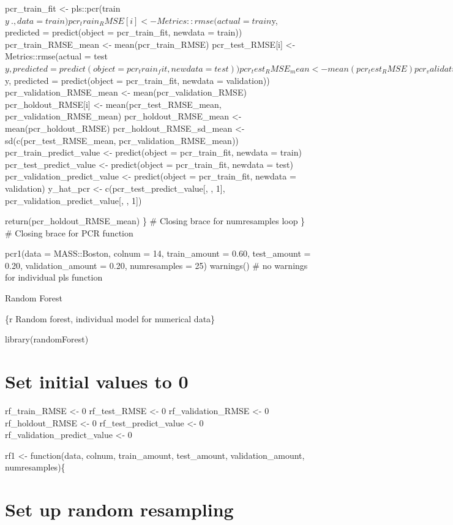 \documentclass[
]{book}
\begin{document}
pcr\_train\_fit \textless- pls::pcr(train\(y ~ ., data = train)
  pcr_train_RMSE[i] <- Metrics::rmse(actual = train\)y, predicted =
predict(object = pcr\_train\_fit, newdata = train)) pcr\_train\_RMSE\_mean
\textless- mean(pcr\_train\_RMSE) pcr\_test\_RMSE{[}i{]} \textless- Metrics::rmse(actual =
test\(y, predicted = predict(object = pcr_train_fit, newdata = test))
  pcr_test_RMSE_mean <- mean(pcr_test_RMSE)
  pcr_validation_RMSE[i] <- Metrics::rmse(actual = validation\)y,
predicted = predict(object = pcr\_train\_fit, newdata = validation))
pcr\_validation\_RMSE\_mean \textless- mean(pcr\_validation\_RMSE)
pcr\_holdout\_RMSE{[}i{]} \textless- mean(pcr\_test\_RMSE\_mean,
pcr\_validation\_RMSE\_mean) pcr\_holdout\_RMSE\_mean \textless-
mean(pcr\_holdout\_RMSE) pcr\_holdout\_RMSE\_sd\_mean \textless-
sd(c(pcr\_test\_RMSE\_mean, pcr\_validation\_RMSE\_mean))
pcr\_train\_predict\_value \textless- predict(object = pcr\_train\_fit, newdata =
train) pcr\_test\_predict\_value \textless- predict(object = pcr\_train\_fit,
newdata = test) pcr\_validation\_predict\_value \textless- predict(object =
pcr\_train\_fit, newdata = validation) y\_hat\_pcr \textless-
c(pcr\_test\_predict\_value{[}, , 1{]}, pcr\_validation\_predict\_value{[}, , 1{]})

return(pcr\_holdout\_RMSE\_mean) \} \# Closing brace for numresamples loop \}
\# Closing brace for PCR function

pcr1(data = MASS::Boston, colnum = 14, train\_amount = 0.60, test\_amount
= 0.20, validation\_amount = 0.20, numresamples = 25) warnings() \# no
warnings for individual pls function

Random Forest

\{r Random forest, individual model for numerical data\}

library(randomForest)

\chapter{Set initial values to 0}\label{set-initial-values-to-0-14}

rf\_train\_RMSE \textless- 0 rf\_test\_RMSE \textless- 0 rf\_validation\_RMSE \textless- 0
rf\_holdout\_RMSE \textless- 0 rf\_test\_predict\_value \textless- 0
rf\_validation\_predict\_value \textless- 0

rf1 \textless- function(data, colnum, train\_amount, test\_amount,
validation\_amount, numresamples)\{

\chapter{Set up random resampling}\label{set-up-random-resampling-12}
\end{document}
